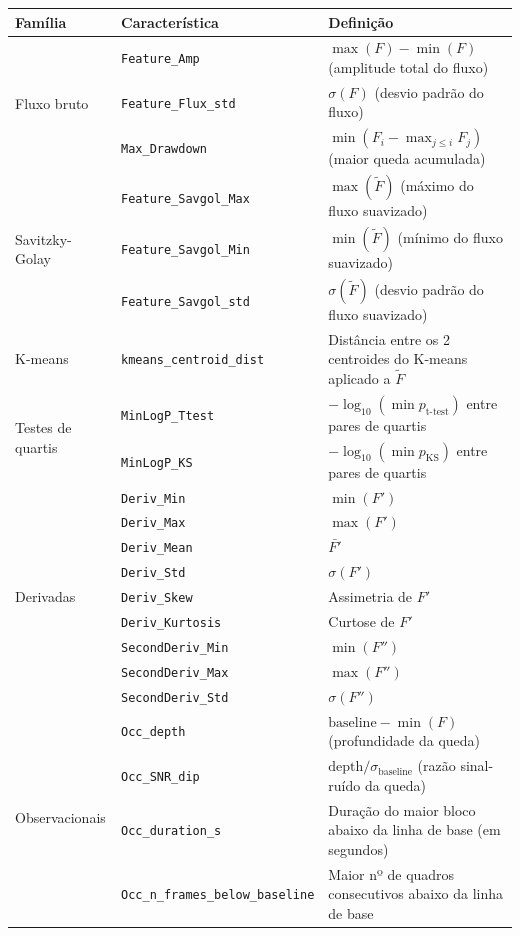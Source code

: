 \documentclass[msc]{on} %
\begin{document}
\begin{table}[htbp]
\begin{tabular}{llp{7.1cm}}
\textbf{Família} & \textbf{Característica} & \textbf{Definição} \\
\hline
\multirow{3}{*}{Fluxo bruto}
& \texttt{Feature\_Amp} & $\max(F) - \min(F)$ (amplitude total do fluxo) \\
& \texttt{Feature\_Flux\_std} & $\sigma(F)$ (desvio padrão do fluxo) \\
& \texttt{Max\_Drawdown} & $\min(F_i - \max_{j \le i} F_j)$ (maior queda acumulada) \\
\hline
\multirow{3}{*}{Savitzky-Golay}
& \texttt{Feature\_Savgol\_Max} & $\max(\tilde{F})$ (máximo do fluxo suavizado) \\
& \texttt{Feature\_Savgol\_Min} & $\min(\tilde{F})$ (mínimo do fluxo suavizado) \\
& \texttt{Feature\_Savgol\_std} & $\sigma(\tilde{F})$ (desvio padrão do fluxo suavizado) \\
\hline
K-means & \texttt{kmeans\_centroid\_dist} & Distância entre os 2 centroides do K-means aplicado a $\tilde{F}$ \\
\hline
\multirow{2}{*}{Testes de quartis}
& \texttt{MinLogP\_Ttest} & $-\log_{10}(\min p_{\text{t-test}})$ entre pares de quartis \\
& \texttt{MinLogP\_KS} & $-\log_{10}(\min p_{\text{KS}})$ entre pares de quartis \\
\hline
\multirow{9}{*}{Derivadas}
& \texttt{Deriv\_Min} & $\min(F')$ \\
& \texttt{Deriv\_Max} & $\max(F')$ \\
& \texttt{Deriv\_Mean} & $\bar{F'}$ \\
& \texttt{Deriv\_Std} & $\sigma(F')$ \\
& \texttt{Deriv\_Skew} & Assimetria de $F'$ \\
& \texttt{Deriv\_Kurtosis} & Curtose de $F'$ \\
& \texttt{SecondDeriv\_Min} & $\min(F'')$ \\
& \texttt{SecondDeriv\_Max} & $\max(F'')$ \\
& \texttt{SecondDeriv\_Std} & $\sigma(F'')$ \\
\hline
\multirow{10}{*}{Observacionais}
& \texttt{Occ\_depth} & $\text{baseline} - \min(F)$ (profundidade da queda) \\
& \texttt{Occ\_SNR\_dip} & $\text{depth}/\sigma_{\text{baseline}}$ (razão sinal-ruído da queda) \\
& \texttt{Occ\_duration\_s} & Duração do maior bloco abaixo da linha de base (em segundos) \\
& \texttt{Occ\_n\_frames\_below\_baseline} & Maior nº de quadros consecutivos abaixo da linha de base \\

\end{tabular}
\end{table}
\end{document}
